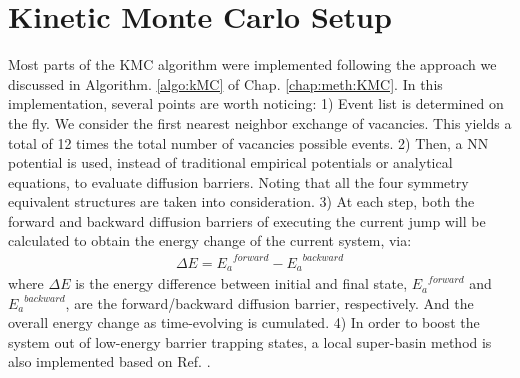 \newpage
\section{Kinetic Monte Carlo Setup}
\label{Chap:Al/Vac:section:KMC}

Most parts of the \ac{KMC} algorithm were implemented following the approach we discussed in Algorithm. \ref{algo:kMC} of Chap. \ref{chap:meth:KMC}. In this implementation, several points are worth noticing: 1) Event list is determined on the fly. We consider the first nearest neighbor exchange of vacancies. This yields a total of 12 times the total number of vacancies possible events. 2) Then, a \ac{NN} potential is used, instead of traditional empirical potentials or analytical equations, to evaluate diffusion barriers. Noting that all the four symmetry equivalent structures are taken into consideration. 3) At each step, both the forward and backward diffusion barriers of executing the current jump will be calculated to obtain the energy change of the current system, via:
\begin{align}
\Delta E = {E_a}^{forward} - {E_a}^{backward}
\label{Chap:Al/Vac:eq:barrier-EDiff}
\end{align}
where $\Delta E$ is the energy difference between initial and final state, ${E_a}^{forward}$ and ${E_a}^{backward}$, are the forward/backward diffusion barrier, respectively. And the overall energy change as time-evolving is cumulated. 4) In order to boost the system out of low-energy barrier trapping states, a local super-basin method is also implemented based on Ref. \cite{fichthorn2013local}.

